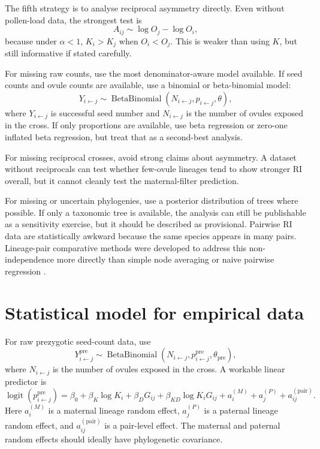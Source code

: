 \documentclass[11pt]{article}
\newcommand{\logit}{\operatorname{logit}}
\begin{document}
The fifth strategy is to analyse reciprocal asymmetry directly. Even without pollen-load data, the strongest test is
\begin{equation}
A_{ij}\sim \log O_j-\log O_i,
\end{equation}
because under \(\alpha<1\), \(K_i>K_j\) when \(O_i<O_j\). This is weaker than using \(K\), but still informative if stated carefully.

For missing raw counts, use the most denominator-aware model available. If seed counts and ovule counts are available, use a binomial or beta-binomial model:
\begin{equation}
Y_{i\leftarrow j}\sim \operatorname{BetaBinomial}(N_{i\leftarrow j},p_{i\leftarrow j},\theta),
\end{equation}
where \(Y_{i\leftarrow j}\) is successful seed number and \(N_{i\leftarrow j}\) is the number of ovules exposed in the cross. If only proportions are available, use beta regression or zero-one inflated beta regression, but treat that as a second-best analysis.

For missing reciprocal crosses, avoid strong claims about asymmetry. A dataset without reciprocals can test whether few-ovule lineages tend to show stronger RI overall, but it cannot cleanly test the maternal-filter prediction.

For missing or uncertain phylogenies, use a posterior distribution of trees where possible. If only a taxonomic tree is available, the analysis can still be publishable as a sensitivity exercise, but it should be described as provisional. Pairwise RI data are statistically awkward because the same species appears in many pairs. Lineage-pair comparative methods were developed to address this non-independence more directly than simple node averaging or naive pairwise regression \citep{Anderson2024}.

\section{Statistical model for empirical data}

For raw prezygotic seed-count data, use
\begin{equation}
Y^{\mathrm{pre}}_{i\leftarrow j}\sim
\operatorname{BetaBinomial}\left(N_{i\leftarrow j},p^{\mathrm{pre}}_{i\leftarrow j},\theta_{\mathrm{pre}}\right),
\end{equation}
where \(N_{i\leftarrow j}\) is the number of ovules exposed in the cross. A workable linear predictor is
\begin{equation}
\logit\left(p^{\mathrm{pre}}_{i\leftarrow j}\right)
=
\beta_0+
\beta_K\log K_i+
\beta_DG_{ij}+
\beta_{KD}\log K_iG_{ij}+
 a_i^{(M)}+a_j^{(P)}+a_{ij}^{(\mathrm{pair})}.
\label{eq:empirical_pre_model}
\end{equation}
Here \(a_i^{(M)}\) is a maternal lineage random effect, \(a_j^{(P)}\) is a paternal lineage random effect, and \(a_{ij}^{(\mathrm{pair})}\) is a pair-level effect. The maternal and paternal random effects should ideally have phylogenetic covariance.
\end{document}

